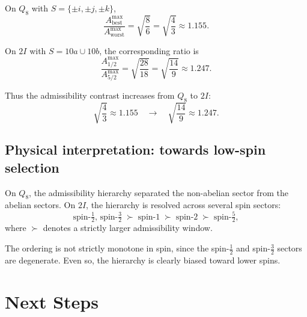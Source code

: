\documentclass[11pt,a4paper]{article}
\begin{document}
      On $Q_8$ with $S=\{\pm i,\pm j,\pm k\}$,
      \begin{equation}
        \frac{A^{\max}_{\mathrm{best}}}{A^{\max}_{\mathrm{worst}}}
        = \sqrt{\frac{8}{6}}
        = \sqrt{\frac{4}{3}}
        \approx 1.155.
        \label{eq:Q8-ratio}
      \end{equation}

      On $2I$ with $S = 10a \cup 10b$, the corresponding ratio is
      \begin{equation}
        \frac{A^{\max}_{1/2}}{A^{\max}_{5/2}}
        = \sqrt{\frac{28}{18}}
        = \sqrt{\frac{14}{9}}
        \approx 1.247.
        \label{eq:2I-ratio}
      \end{equation}

      Thus the admissibility contrast increases from $Q_8$ to $2I$:
      \begin{equation}
        \sqrt{\frac{4}{3}}
        \approx 1.155
        \quad\longrightarrow\quad
        \sqrt{\frac{14}{9}}
        \approx 1.247.
        \label{eq:growing-hierarchy}
      \end{equation}

    \subsection{Physical interpretation: towards low-spin selection}
      \label{sec:step5-physics}

      On $Q_8$, the admissibility hierarchy separated the non-abelian sector from
      the abelian sectors.
      On $2I$, the hierarchy is resolved across several spin sectors:
      \begin{equation}
        \text{spin-}\tfrac{1}{2},\,\text{spin-}\tfrac{3}{2}
        \;\succ\;
        \text{spin-}1
        \;\succ\;
        \text{spin-}2
        \;\succ\;
        \text{spin-}\tfrac{5}{2},
        \label{eq:spin-ladder}
      \end{equation}
      where $\succ$ denotes a strictly larger admissibility window.

      The ordering is not strictly monotone in spin, since the
      spin-$\tfrac{1}{2}$ and spin-$\tfrac{3}{2}$ sectors are degenerate.
      Even so, the hierarchy is clearly biased toward lower spins.

  \section{Next Steps}
    \label{sec:next}
\end{document}
